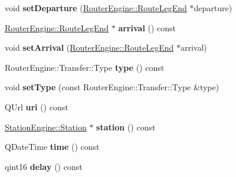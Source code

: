 \begin{DoxyCompactItemize}
void {\bfseries set\+Departure} (\mbox{\hyperlink{classRouterEngine_1_1RouteLegEnd}{Router\+Engine\+::\+Route\+Leg\+End}} $\ast$departure)
\item 
\mbox{\label{classRouterEngine_1_1Transfer_add9dd9f32aeb0a03643b4b3c7f9af752}} 
\mbox{\hyperlink{classRouterEngine_1_1RouteLegEnd}{Router\+Engine\+::\+Route\+Leg\+End}} $\ast$ {\bfseries arrival} () const
\item 
\mbox{\label{classRouterEngine_1_1Transfer_acbb38fde6669e70006edd8cfadda4aa9}} 
void {\bfseries set\+Arrival} (\mbox{\hyperlink{classRouterEngine_1_1RouteLegEnd}{Router\+Engine\+::\+Route\+Leg\+End}} $\ast$arrival)
\item 
\mbox{\label{classRouterEngine_1_1Transfer_aa68b42bfaacfe79b9d085c6a94aae2f8}} 
Router\+Engine\+::\+Transfer\+::\+Type {\bfseries type} () const
\item 
\mbox{\label{classRouterEngine_1_1Transfer_a2fd8d8f407490ad51b4604b3b379230e}} 
void {\bfseries set\+Type} (const Router\+Engine\+::\+Transfer\+::\+Type \&type)
\item 
\mbox{\label{classRouterEngine_1_1Transfer_a9951403dc91e9e9be8a11cef284f7df8}} 
Q\+Url {\bfseries uri} () const
\item 
\mbox{\label{classRouterEngine_1_1Transfer_a25dc4c790111fea727fdfe37413d0600}} 
\mbox{\hyperlink{classStationEngine_1_1Station}{Station\+Engine\+::\+Station}} $\ast$ {\bfseries station} () const
\item 
\mbox{\label{classRouterEngine_1_1Transfer_ae3a407001d9a4f1324dc4421d5d41bfb}} 
Q\+Date\+Time {\bfseries time} () const
\item 
\mbox{\label{classRouterEngine_1_1Transfer_a0453774c1c6b2ba31cb2aafdaa60487d}} 
qint16 {\bfseries delay} () const
\item 
\mbox{\label{classRouterEngine_1_1Transfer_a20b15b42fe19d1cf2d139b33242c7d02}} 

\end{DoxyCompactItemize}
